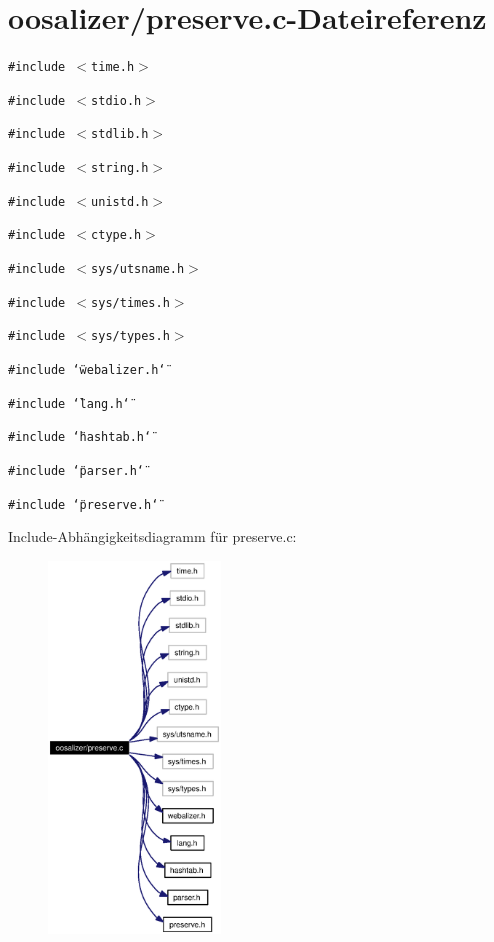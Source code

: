 \section{oosalizer/preserve.c-Dateireferenz}
\label{preserve_8c}
{\tt \#include $<$time.h$>$}\par
{\tt \#include $<$stdio.h$>$}\par
{\tt \#include $<$stdlib.h$>$}\par
{\tt \#include $<$string.h$>$}\par
{\tt \#include $<$unistd.h$>$}\par
{\tt \#include $<$ctype.h$>$}\par
{\tt \#include $<$sys/utsname.h$>$}\par
{\tt \#include $<$sys/times.h$>$}\par
{\tt \#include $<$sys/types.h$>$}\par
{\tt \#include \char`\"{}webalizer.h\char`\"{}}\par
{\tt \#include \char`\"{}lang.h\char`\"{}}\par
{\tt \#include \char`\"{}hashtab.h\char`\"{}}\par
{\tt \#include \char`\"{}parser.h\char`\"{}}\par
{\tt \#include \char`\"{}preserve.h\char`\"{}}\par


Include-Abh\"{a}ngigkeitsdiagramm f\"{u}r preserve.c:\begin{figure}[H]
\begin{center}
\leavevmode
\includegraphics[width=130pt]{preserve_8c__incl}
\end{center}
\end{figure}
